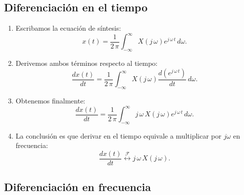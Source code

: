 \subsection{Diferenciación en el tiempo}

\begin{enumerate}
	\item Escribamos la ecuación de síntesis:
	\begin{equation}
		x(t) = \frac{1}{2 \, \pi} \int_{-\infty}^{\infty} X(j \, \omega) e^{j \, \omega \, t} \, d\omega .
	\end{equation}
	
	\item Derivemos ambos términos respecto al tiempo:
	\begin{equation}
		\frac{dx(t)}{dt} = \frac{1}{2 \, \pi} \int_{-\infty}^{\infty} X(j \, \omega) \frac{d(e^{j \, \omega \, t})}{dt} \, d\omega.
	\end{equation}
	
	\item Obtenemos finalmente:
	\begin{equation}
		\frac{dx(t)}{dt} = \frac{1}{2 \, \pi} \int_{-\infty}^{\infty} j \, \omega \, X(j \, \omega) e^{j \, \omega \, t} \, d\omega.
	\end{equation}
	
	\item La conclusión es que derivar en el tiempo equivale a multiplicar por $j\omega$ en frecuencia:
	\begin{equation}
		\frac{dx(t)}{dt} \stackrel{\mathcal{F}}{\longleftrightarrow} j \, \omega \, X(j \, \omega) .
	\end{equation}
	
\end{enumerate}

\subsection{Diferenciación en frecuencia}

